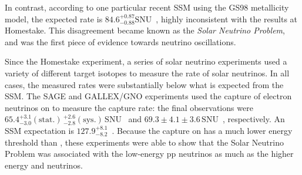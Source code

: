 In contrast, according to one particular recent SSM using the GS98 metallicity model, the expected rate is $84.6^{+0.87}_{-0.88}\mathrm{ SNU}$~\cite{pena-garaySolarNeutrinosSolar2008}, highly inconsistent with the results at Homestake. This disagreement became known as the \textit{Solar Neutrino Problem}, and was the first piece of evidence towards neutrino oscillations.

Since the Homestake experiment, a series of solar neutrino experiments used a variety of different target isotopes to measure the rate of solar neutrinos. In all cases, the measured rates were substantially below what is expected from the SSM. The SAGE and GALLEX/GNO experiments used the capture of electron neutrinos on  to measure the capture rate: the final observations were $65.4^{+3.1}_{-3.0}(\mathrm{stat.})\,^{+2.6}_{-2.8}(\mathrm{sys.})\,\mathrm{ SNU}$~\cite{abdurashitovMeasurementSolarNeutrino2009} and $69.3\pm4.1\pm3.6\,\mathrm{ SNU}$~\cite{altmannCompleteResultsFive2005}, respectively. An SSM expectation is $127.9^{+8.1}_{-8.2}$~\cite{pena-garaySolarNeutrinosSolar2008}. Because the capture on  has a much lower energy threshold than , these experiments were able to show that the Solar Neutrino Problem was associated with the low-energy pp neutrinos as much as the higher energy \beight{} and  neutrinos.

